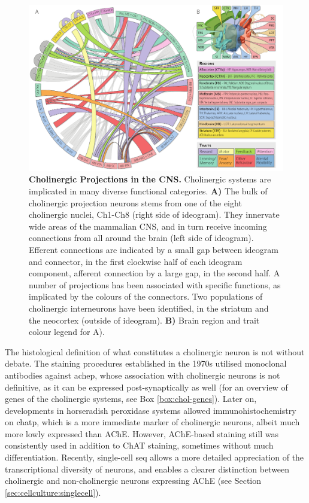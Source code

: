 \begin{figure}
\includegraphics[width=\textwidth]{figures/projections}
\caption[Cholinergic Projections.]{\textbf{Cholinergic Projections in the CNS.} Cholinergic systems are implicated in many diverse functional categories. \textbf{A)} The bulk of cholinergic projection neurons stems from one of the eight cholinergic nuclei, Ch1-Ch8 (right side of ideogram). They innervate wide areas of the mammalian CNS, and in turn receive incoming connections from all around the brain (left side of ideogram). Efferent connections are indicated by a small gap between ideogram and connector, in the first clockwise half of each ideogram component, afferent connection by a large gap, in the second half. A number of projections has been associated with specific functions, as implicated by the colours of the connectors. Two populations of cholinergic interneurons have been identified, in the striatum and the neocortex (outside of ideogram). \textbf{B)} Brain region and trait colour legend for A).
\label{fig:projections}}
\end{figure}

The histological definition of what constitutes a cholinergic neuron is not without debate. The staining procedures established in the 1970s utilised monoclonal antibodies against \ac{achep},\cite{Mesulam1976} whose association with cholinergic neurons is not definitive, as it can be expressed post-synaptically as well (for an overview of genes of the cholinergic systems, see Box \ref{box:chol-genes}). Later on, developments in horseradish peroxidase systems allowed immunohistochemistry on \ac{chatp}, which is a more immediate marker of cholinergic neurons,\cite{Mesulam1984} albeit much more lowly expressed than AChE. However, AChE-based staining still was consistently used in addition to ChAT staining,\cite{Mesulam1988} sometimes without much differentiation. Recently, single-cell \ac{seq} allows a more detailed appreciation of the transcriptional diversity of neurons, and enables a clearer distinction between cholinergic and non-cholinergic neurons expressing AChE (see Section \ref{sec:cellculture:singlecell}).

